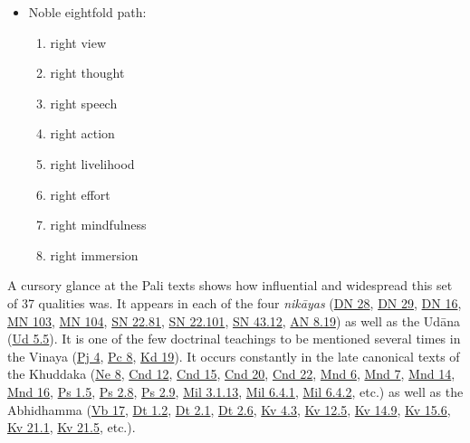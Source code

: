 \documentclass[12pt,openany]{book}%
\begin{document}
\begin{itemize}
%
\item Noble eightfold path:
\begin{enumerate}%
\item right view%
\item right thought%
\item right speech%
\item right action%
\item right livelihood%
\item right effort%
\item right mindfulness%
\item right immersion%
\end{enumerate}

%
\end{itemize}

A cursory glance at the Pali texts shows how influential and widespread this set of 37 qualities was. It appears in each of the four \textit{\textsanskrit{nikāyas}} (\href{https://suttacentral.net/dn28}{DN 28}, \href{https://suttacentral.net/dn29}{DN 29}, \href{https://suttacentral.net/dn16}{DN 16}, \href{https://suttacentral.net/mn103}{MN 103}, \href{https://suttacentral.net/mn104}{MN 104}, \href{https://suttacentral.net/sn22.81}{SN 22.81}, \href{https://suttacentral.net/sn22.101}{SN 22.101}, \href{https://suttacentral.net/sn43.12}{SN 43.12}, \href{https://suttacentral.net/an8.19}{AN 8.19}) as well as the \textsanskrit{Udāna} (\href{https://suttacentral.net/ud5.5}{Ud 5.5}). It is one of the few doctrinal teachings to be mentioned several times in the Vinaya (\href{https://suttacentral.net/pj4}{Pj 4}, \href{https://suttacentral.net/pc8}{Pc 8}, \href{https://suttacentral.net/pli-tv-kd19}{Kd 19}). It occurs constantly in the late canonical texts of the Khuddaka (\href{https://suttacentral.net/ne8}{Ne 8}, \href{https://suttacentral.net/cnd12}{Cnd 12}, \href{https://suttacentral.net/cnd15}{Cnd 15}, \href{https://suttacentral.net/cnd20}{Cnd 20}, \href{https://suttacentral.net/cnd22}{Cnd 22}, \href{https://suttacentral.net/mnd6}{Mnd 6}, \href{https://suttacentral.net/mnd7}{Mnd 7}, \href{https://suttacentral.net/mnd14}{Mnd 14}, \href{https://suttacentral.net/mnd16}{Mnd 16}, \href{https://suttacentral.net/ps1.5}{Ps 1.5}, \href{https://suttacentral.net/ps2.8}{Ps 2.8}, \href{https://suttacentral.net/ps2.9}{Ps 2.9}, \href{https://suttacentral.net/mil3.1.13}{Mil 3.1.13}, \href{https://suttacentral.net/mil6.4.1}{Mil 6.4.1}, \href{https://suttacentral.net/mil6.4.2}{Mil 6.4.2}, etc.) as well as the Abhidhamma (\href{https://suttacentral.net/vb17}{Vb 17}, \href{https://suttacentral.net/Dt1.2}{Dt 1.2}, \href{https://suttacentral.net/Dt2.1}{Dt 2.1}, \href{https://suttacentral.net/Dt2.6}{Dt 2.6}, \href{https://suttacentral.net/kv4.3}{Kv 4.3}, \href{https://suttacentral.net/kv12.5}{Kv 12.5}, \href{https://suttacentral.net/kv14.9}{Kv 14.9}, \href{https://suttacentral.net/kv15.6}{Kv 15.6}, \href{https://suttacentral.net/kv21.1}{Kv 21.1}, \href{https://suttacentral.net/kv21.5}{Kv 21.5}, etc.).
\end{document}
